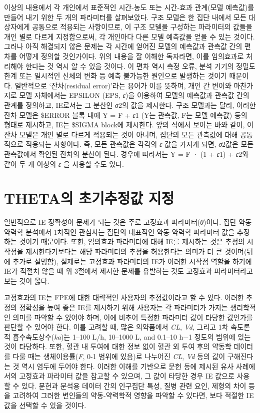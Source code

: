 \documentclass[
  10pt,
]{krantz}
\begin{document}
이상의 내용에서 각 개인에서 표준적인 시간-농도 또는 시간-효과 관계(모델 예측값)를 만들어 내기 위한 두 개의 파라미터를
살펴보았다. 구조 모델은 한 집단 내에서 모든 대상자에게 공통으로 적용되는 사항이므로, 이 구조 모델을 구성하는
파라미터의 값들을 개인 별로 다르게 지정함으로써, 각 개인마다 다른 모델 예측값을 얻을 수 있는 것이다. 그러나 아직
해결되지 않은 문제는 각 시간에 얻어진 모델의 예측값과 관측값 간의 편차를 어떻게 정의할 것인가이다. 위의 내용을 잘
이해한 독자라면, 이를 임의효과로 처리해야 한다는 것 역시 알 수 있을 것이다. 이 편차 역시 측정 오류, 분석 기기의 정밀도
한계 또는 일시적인 신체의 변화 등 예측 불가능한 원인으로 발생하는 것이기 때문이다. 일반적으로 `잔차(residual
error)'라는 용어가 이를 뜻하며, 개인 간 변이와 마찬가지로 모델 자체에서는 EPSILON (EPS, \emph{ε})을 이용하여
모델의 예측값과 관측값 간의 관계를 정의하고, IE로서는 그 분산인 \emph{σ}2의 값을 제시한다. 구조
모델과는 달리, 이러한 잔차 모델은 \$ERROR 블록 내에 Y = F + \emph{ε}1 (Y는 관측값, F는
모델 예측값) 등의 형태로 제시하고, IE는 \$SIGMA block에 제시한다. 앞의 식에서 보이는 바와 같이, 이 잔차 모델은
개인 별로 다르게 적용되는 것이 아니며, 집단의 모든 관측값에 대해 공통적으로 적용되는 사항이다. 즉, 모든 관측값은 각각의
\emph{ε} 값을 가지게 되면, \emph{σ}2값은 모든 관측값에서 확인된 잔차의 분산이 된다. 경우에 따라서는 Y = F
· (1 + \emph{ε}1) + \emph{ε}2와 같이 두 개 이상의 \emph{ε} 을 사용할 수도 있다.

\hypertarget{thetauxc758-uxcd08uxae30uxcd94uxc815uxac12-uxc9c0uxc815}{%
\section{THETA의 초기추정값 지정}\label{thetauxc758-uxcd08uxae30uxcd94uxc815uxac12-uxc9c0uxc815}}

일반적으로 IE 정확성이 문제가 되는 것은 주로 고정효과 파라미터(\emph{θ})이다. 집단 약동-약력학 분석에서 1차적인 관심사는
집단의 대표적인 약동-약력학 파라미터 값을 추정하는 것이기 때문이다. 또한, 임의효과 파라미터에 대해 IE를 제시하는
것은 추정의 시작점을 제시한다기보다는 해당 파라미터의 추정을 허용한다는 의미가 더 큰 것이며(뒤에 추가로 설명함), 실제로는
고정효과 파라미터의 IE가 이러한 시작점 역할을 하기에 IE가 적절치 않을 때 위 3절에서 제시한 문제를 유발하는 것도
고정효과 파라미터라고 보는 것이 옳다.

고정효과의 IE는 FPE에 대한 대략적인 사용자의 추정값이라고 할 수 있다. 이러한 추정의 정확성을 높여 좋은 IE를 제시하기
위해 사용자는 각 파라미터가 가지는 생리학적인 의미를 파악할 수 있어야 하며, 이에 비추어 특정한 파라미터 값이 타당한
값인가를 판단할 수 있어야 한다. 이를 고려할 때, 많은 의약품에서 \emph{CL}, \emph{Vd}, 그리고 1차
속도론적 흡수속도상수(\emph{ka})는 1--100 L/h, 10--1000 L, and 0.1--10 h−1 정도의
범위에 있는 것이 타당하다. 또한, 혈관 내 투여에 대한 정보 없이 혈관 외 투여 후의 약동학 데이터를 다룰 때는
생체이용률(\emph{F}, 0-1 범위에 있음)로 나누어진 \emph{CL}, \emph{Vd} 등의 값이 구해진다는
것 역시 염두에 두어야 한다. 이러한 이해를 기반으로 문헌 등에 제시된 유사 사례에서의 고정효과 파라미터 값을 참고할 수 있으며,
그 값이 타당한 경우 IE 값으로 사용할 수 있다. 문헌과 분석용 데이터 간의 인구집단 특성, 질병 관련 요인, 제형의 차이 등을
고려하여 그러한 변인들의 약동-약력학적 영향을 파악할 수 있다면, 보다 적절한 IE 값을 선택할 수 있을 것이다.
\end{document}
